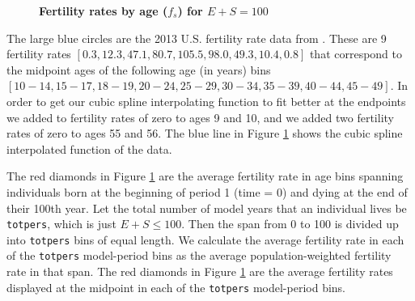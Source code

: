 \documentclass[letterpaper,12pt]{article}
\theoremstyle{definition}
\begin{document}
    \begin{figure}[htbp]\centering \captionsetup{width=4.0in}
      \caption{\label{FigFertRates}\textbf{Fertility rates by age ($f_s$) for $E+S=100$}}
    \end{figure}

    The large blue circles are the 2013 U.S. fertility rate data from \citet{MartinEtAl:2015}. These are 9 fertility rates $[0.3, 12.3, 47.1, 80.7, 105.5, 98.0, 49.3, 10.4, 0.8]$ that correspond to the midpoint ages of the following age (in years) bins $[10-14, 15-17, 18-19, 20-24, 25-29, 30-34, 35-39, 40-44, 45-49]$. In order to get our cubic spline interpolating function to fit better at the endpoints we added to fertility rates of zero to ages 9 and 10, and we added two fertility rates of zero to ages 55 and 56. The blue line in Figure \ref{FigFertRates} shows the cubic spline interpolated function of the data.

    The red diamonds in Figure \ref{FigFertRates} are the average fertility rate in age bins spanning individuals born at the beginning of period 1 (time = 0) and dying at the end of their 100th year. Let the total number of model years that an individual lives be \texttt{totpers}, which is just $E+S\leq 100$. Then the span from 0 to 100 is divided up into \texttt{totpers} bins of equal length. We calculate the average fertility rate in each of the \texttt{totpers} model-period bins as the average population-weighted fertility rate in that span. The red diamonds in Figure \ref{FigFertRates} are the average fertility rates displayed at the midpoint in each of the \texttt{totpers} model-period bins.
\end{document}
